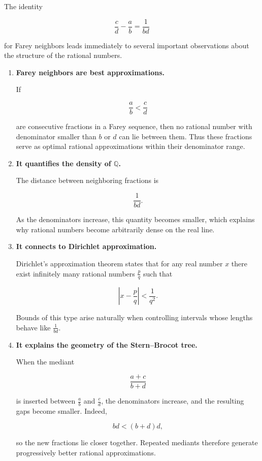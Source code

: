 \begin{remark}

The identity

\[
\frac{c}{d}-\frac{a}{b}=\frac{1}{bd}
\]

for Farey neighbors leads immediately to several important
observations about the structure of the rational numbers.

\begin{enumerate}

\item \textbf{Farey neighbors are best approximations.}

If

\[
\frac{a}{b} < \frac{c}{d}
\]

are consecutive fractions in a Farey sequence, then no rational
number with denominator smaller than $b$ or $d$ can lie between them.
Thus these fractions serve as optimal rational approximations within
their denominator range.

\item \textbf{It quantifies the density of $\mathbb{Q}$.}

The distance between neighboring fractions is

\[
\frac{1}{bd}.
\]

As the denominators increase, this quantity becomes smaller, which
explains why rational numbers become arbitrarily dense on the real
line.

\item \textbf{It connects to Dirichlet approximation.}

Dirichlet's approximation theorem states that for any real number
$x$ there exist infinitely many rational numbers $\frac{p}{q}$ such
that

\[
\left|x-\frac{p}{q}\right| < \frac{1}{q^{2}}.
\]

Bounds of this type arise naturally when controlling intervals whose
lengths behave like $\frac{1}{bd}$.

\item \textbf{It explains the geometry of the Stern--Brocot tree.}

When the mediant

\[
\frac{a+c}{b+d}
\]

is inserted between $\frac{a}{b}$ and $\frac{c}{d}$, the denominators
increase, and the resulting gaps become smaller.  Indeed,

\[
bd < (b+d)d,
\]

so the new fractions lie closer together.  Repeated mediants therefore
generate progressively better rational approximations.

\end{enumerate}

\end{remark}


